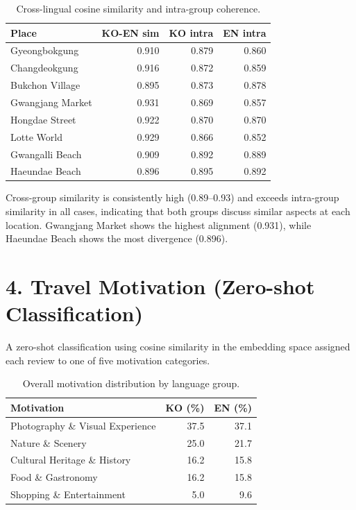 \documentclass[11pt,a4paper]{article}
\begin{document}
\begin{table}[H]
\centering
\small
\begin{tabular}{lRRR}
\toprule
\textbf{Place} & \textbf{KO-EN sim} & \textbf{KO intra} & \textbf{EN intra} \\
\midrule
Gyeongbokgung    & 0.910 & 0.879 & 0.860 \\
Changdeokgung    & 0.916 & 0.872 & 0.859 \\
Bukchon Village  & 0.895 & 0.873 & 0.878 \\
Gwangjang Market & 0.931 & 0.869 & 0.857 \\
Hongdae Street   & 0.922 & 0.870 & 0.870 \\
Lotte World      & 0.929 & 0.866 & 0.852 \\
Gwangalli Beach  & 0.909 & 0.892 & 0.889 \\
Haeundae Beach   & 0.896 & 0.895 & 0.892 \\
\bottomrule
\end{tabular}
\caption{Cross-lingual cosine similarity and intra-group coherence.}
\end{table}

Cross-group similarity is consistently high (0.89--0.93) and exceeds
intra-group similarity in all cases, indicating that both groups discuss
similar aspects at each location. Gwangjang Market shows the highest
alignment (0.931), while Haeundae Beach shows the most divergence (0.896).

\section*{4. Travel Motivation (Zero-shot Classification)}

A zero-shot classification using cosine similarity in the embedding
space assigned each review to one of five motivation categories.

\begin{table}[H]
\centering
\small
\begin{tabular}{lRR}
\toprule
\textbf{Motivation} & \textbf{KO (\%)} & \textbf{EN (\%)} \\
\midrule
Photography \& Visual Experience & 37.5 & 37.1 \\
Nature \& Scenery                & 25.0 & 21.7 \\
Cultural Heritage \& History     & 16.2 & 15.8 \\
Food \& Gastronomy               & 16.2 & 15.8 \\
Shopping \& Entertainment        &  5.0 &  9.6 \\
\bottomrule
\end{tabular}
\caption{Overall motivation distribution by language group.}
\end{table}
\end{document}
